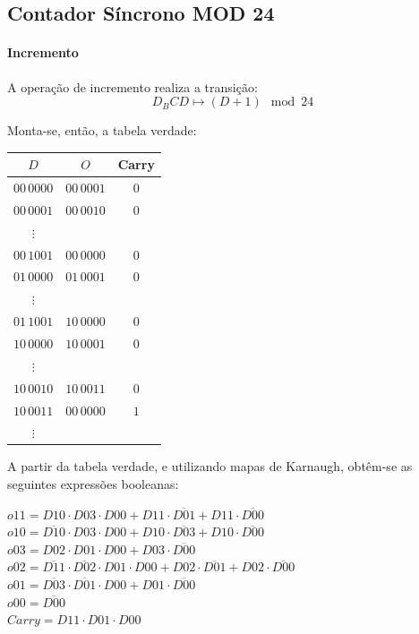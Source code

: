 \subsection{Contador Síncrono MOD 24}

\paragraph{Incremento}

A operação de incremento realiza a transição:
\[
D_BCD \mapsto (D + 1) \mod 24
\]


Monta-se, então, a tabela verdade:

\begin{center}
\begin{tabular}{c|cc}
$D$ & $O$ & Carry \\
\hline
$00\,0000$ & $00\,0001$ & $0$ \\
$00\,0001$ & $00\,0010$ & $0$ \\
$\vdots$ &  &  \\
$00\,1001$ & $00\,0000$ & $0$ \\
$01\,0000$ & $01\,0001$ & $0$ \\
$\vdots$ &  &  \\
$01\,1001$ & $10\,0000$ & $0$ \\
$10\,0000$ & $10\,0001$ & $0$ \\
$\vdots$ &  &  \\
$10\,0010$ & $10\,0011$ & $0$ \\
$10\,0011$ & $00\,0000$ & $1$ \\
$\vdots$ &  &  \\
\end{tabular}
\end{center}

A partir da tabela verdade, e utilizando mapas de Karnaugh, obtêm-se as seguintes expressões booleanas:

$o11 = D10 \cdot D03 \cdot D00+D11 \cdot  \overline{D01} +D11 \cdot  \overline{D00} $~\\
$o10 =  \overline{D10}  \cdot D03 \cdot D00+D10 \cdot  \overline{D03} +D10 \cdot  \overline{D00} $~\\
$o03 = D02 \cdot D01 \cdot D00+D03 \cdot  \overline{D00} $~\\
$o02 =  \overline{D11}  \cdot  \overline{D02}  \cdot D01 \cdot D00+D02 \cdot  \overline{D01} +D02 \cdot  \overline{D00} $~\\
$o01 =  \overline{D03}  \cdot  \overline{D01}  \cdot D00+D01 \cdot  \overline{D00} $~\\
$o00 =  \overline{D00} $~\\
$Carry = D11 \cdot D01 \cdot D00$~\\

